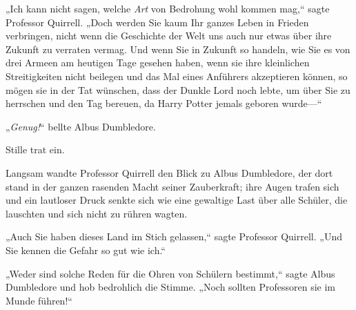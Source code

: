 „Ich kann nicht sagen, welche \emph{Art} von Bedrohung wohl kommen mag,“ sagte Professor Quirrell. „Doch werden Sie kaum Ihr ganzes Leben in Frieden verbringen, nicht wenn die Geschichte der Welt uns auch nur etwas über ihre Zukunft zu verraten vermag. Und wenn Sie in Zukunft so handeln, wie Sie es von drei Armeen am heutigen Tage gesehen haben, wenn sie ihre kleinlichen Streitigkeiten nicht beilegen und das Mal eines Anführers akzeptieren können, so mögen sie in der Tat wünschen, dass der Dunkle Lord noch lebte, um über Sie zu herrschen und den Tag bereuen, da Harry Potter jemals geboren wurde—“

„\emph{Genug!}“ bellte Albus Dumbledore.

Stille trat ein.

Langsam wandte Professor Quirrell den Blick zu Albus Dumbledore, der dort stand in der ganzen rasenden Macht seiner Zauberkraft; ihre Augen trafen sich und ein lautloser Druck senkte sich wie eine gewaltige Last über alle Schüler, die lauschten und sich nicht zu rühren wagten.

„Auch Sie haben dieses Land im Stich gelassen,“ sagte Professor Quirrell. „Und Sie kennen die Gefahr so gut wie ich.“

„Weder sind solche Reden für die Ohren von Schülern bestimmt,“ sagte Albus Dumbledore und hob bedrohlich die Stimme. „Noch sollten Professoren sie im Munde führen!“

